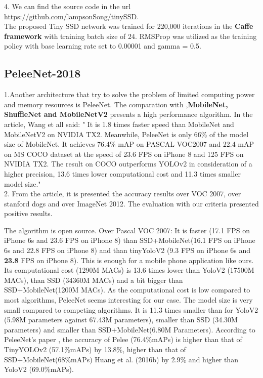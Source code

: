 \documentclass[10pt]{article}
\begin{document}
4. We can find the source code in the url \url{https://github.com/lampsonSong/tinySSD}.\\
The proposed Tiny SSD network was trained for 220,000 iterations in the \textbf{Caffe framework} with training batch size of 24. RMSProp was utilized as the training policy with base learning rate set to 0.00001 and gamma = 0.5.\\


\subsection{PeleeNet-2018}

1.Another architecture that try to solve the problem of limited computing power and memory resources is PeleeNet.\cite{wang2018pelee} The comparation with ,\textbf{MobileNet, ShuffleNet and MobileNetV2} presents a high performance algorithm.
In the article, Wang et all said: " It is 1.8 times faster speed than MobileNet and MobileNetV2 on NVIDIA TX2. Meanwhile, PeleeNet is only 66\% of the model size of MobileNet. It achieves 76.4\% mAP on PASCAL VOC2007 and 22.4 mAP on MS COCO dataset at the speed of 23.6 FPS on iPhone 8 and 125 FPS on NVIDIA TX2. The result on COCO outperforms YOLOv2 in consideration of a higher precision, 13.6 times lower computational cost and 11.3 times smaller model size."\\

2.
From the article\cite{wang2018pelee}, it is presented the accuracy results over VOC 2007, over stanford dogs and over ImageNet 2012.  The evaluation with our criteria presented positive results. 

The algorithm is open source. Over Pascal VOC 2007:
It is faster (17.1 FPS on iPhone 6s and 23.6 FPS on iPhone 8) than SSD+MobileNet(16.1 FPS on iPhone 6s and 22.8 FPS on iPhone 8) and than tinyYoloV2 (9.3 FPS on iPhone 6s and \textbf{23.8} FPS on iPhone 8). This is enough for a mobile phone application like ours. 
Its computational cost (1290M MACs) is 13.6 times lower than YoloV2 (17500M MACs), than SSD (34360M MACs) and a bit bigger than SSD+MobileNet(1200M MACs). As the computational cost is low compared to most algorithms, PeleeNet seems interesting for our case.
The model size is very small compared to competing algorithms. It is 11.3 times smaller than for YoloV2 (5.98M parameters against 67.43M parameters), smaller than SSD (34.30M  parameters) and smaller than SSD+MobileNet(6.80M Parameters). According to PeleeNet's paper \cite{wang2018pelee}, the accuracy of Pelee (76.4\%mAPs) is higher than that of TinyYOLOv2 (57.1\%mAPs) by 13.8\%, higher than that of SSD+MobileNet(68\%mAPs) Huang et al. (2016b) by 2.9\% and higher than YoloV2 (69.0\%mAPs). \\
\end{document}
